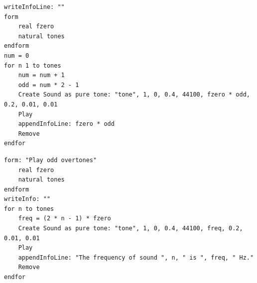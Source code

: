 \documentclass[12pt, english]{article}
\begin{document}
\begin{lstlisting}
writeInfoLine: ""
form
	real fzero
	natural tones
endform
num = 0
for n 1 to tones
	num = num + 1
	odd = num * 2 - 1
	Create Sound as pure tone: "tone", 1, 0, 0.4, 44100, fzero * odd, 0.2, 0.01, 0.01
	Play
	appendInfoLine: fzero * odd
	Remove
endfor
\end{lstlisting}

\begin{lstlisting}[rulesepcolor=\color{blue}]
form: "Play odd overtones"
	real fzero
	natural tones
endform
writeInfo: ""
for n to tones
	freq = (2 * n - 1) * fzero
	Create Sound as pure tone: "tone", 1, 0, 0.4, 44100, freq, 0.2, 0.01, 0.01
	Play
	appendInfoLine: "The frequency of sound ", n, " is ", freq, " Hz."
	Remove
endfor
\end{lstlisting}

\vspace{10pt}
\end{document}
